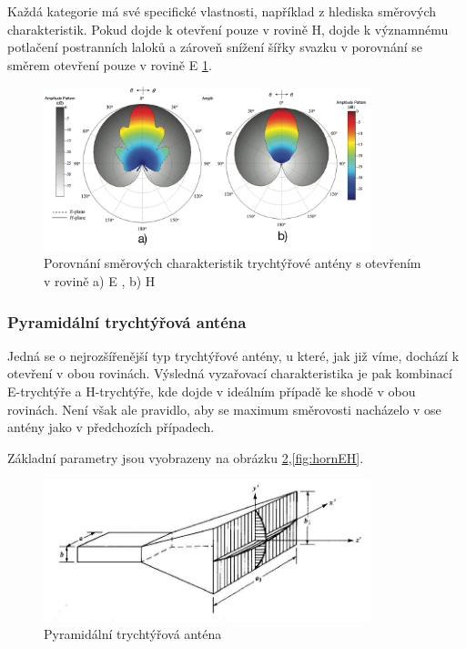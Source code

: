 Každá kategorie má své specifické vlastnosti, například z hlediska směrových charakteristik. Pokud dojde k otevření pouze v rovině H, dojde k významnému potlačení postranních laloků a zároveň snížení šířky svazku v porovnání se směrem otevření pouze v rovině E \ref{fig:hornComp}.

\begin{figure}[!htbp]
\begin{center}
\includegraphics[width=9.5cm]{pics/hornComp}
\caption{Porovnání směrových charakteristik trychtýřové antény s otevřením v rovině a) E , b) H \cite{ConstantineTheory}}
\label{fig:hornComp}
\end{center}
\end{figure}

\subsubsection{Pyramidální trychtýřová anténa}
Jedná se o nejrozšířenější typ trychtýřové antény, u které, jak již víme, dochází k otevření v obou rovinách. Výsledná vyzařovací charakteristika je pak kombinací E-trychtýře a H-trychtýře, kde dojde v ideálním případě ke shodě v obou rovinách. Není však ale pravidlo, aby se maximum směrovosti nacházelo v ose antény jako v předchozích případech.

Základní parametry jsou vyobrazeny na obrázku \ref{fig:horn},\ref{fig:hornEH}.

\begin{figure}[!htbp]
\begin{center}
\includegraphics[width=9.5cm]{pics/horn}
\caption{Pyramidální trychtýřová anténa \cite{ConstantineTheory}}
\label{fig:horn}
\end{center}
\end{figure}

